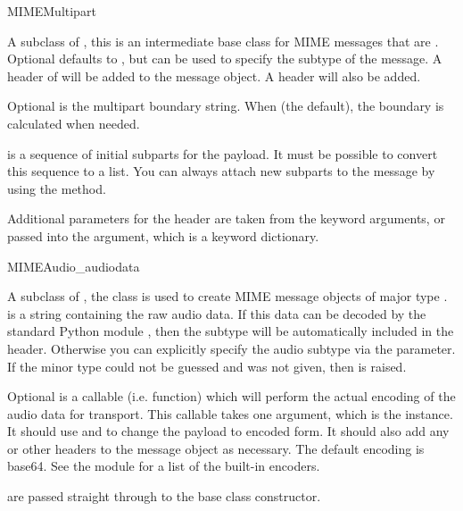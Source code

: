 \begin{classdesc}{MIMEMultipart}{}

A subclass of , this is an intermediate base class for
MIME messages that are .  Optional 
defaults to , but can be used to specify the subtype
of the message.  A  header of
 will be added to the message
object.  A  header will also be added.

Optional  is the multipart boundary string.  When
 (the default), the boundary is calculated when needed.

 is a sequence of initial subparts for the payload.  It
must be possible to convert this sequence to a list.  You can always
attach new subparts to the message by using the
 method.

Additional parameters for the  header are
taken from the keyword arguments, or passed into the 
argument, which is a keyword dictionary.

\end{classdesc}

\begin{classdesc}{MIMEAudio}{_audiodata}

A subclass of , the  class
is used to create MIME message objects of major type .
 is a string containing the raw audio data.  If this
data can be decoded by the standard Python module ,
then the subtype will be automatically included in the
 header.  Otherwise you can explicitly specify the
audio subtype via the  parameter.  If the minor type could
not be guessed and  was not given, then 
is raised.

Optional  is a callable (i.e. function) which will
perform the actual encoding of the audio data for transport.  This
callable takes one argument, which is the  instance.
It should use  and  to
change the payload to encoded form.  It should also add any
 or other headers to the message
object as necessary.  The default encoding is base64.  See the
 module for a list of the built-in encoders.

 are passed straight through to the base class constructor.
\end{classdesc}

